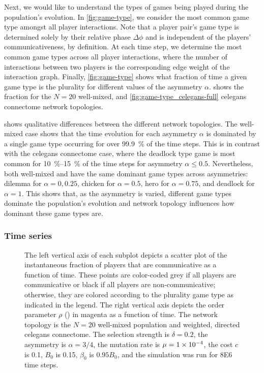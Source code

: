 \documentclass[pdflatex,lineno,referee,sn-mathphys-ay]{sn-jnl}
\begin{document}
Next, we would like to understand the types of games being played
during the population's evolution.
In \cref{fig:game-type}, we consider the most common game type
amongst all player interactions.
Note that a player pair's game type is determined solely
by their relative phase $\Delta \phi$ and is independent
of the players' communicativeness, by definition.
At each time step, we determine the most common game types
across all player interactions,
where the number of interactions between two players
is the corresponding edge weight of the interaction graph.
Finally, \cref{fig:game-type} shows what fraction of time
a given game type is the plurality for different values
of the asymmetry $\alpha$.
shows the fraction for the
$N=20$ well-mixed,
and
\cref{fig:game-type_celegans-full}
\gls{celegans} connectome network topologies.

 shows qualitative differences
between the different network topologies.
The  well-mixed case
shows that the time evolution for each asymmetry $\alpha$
is dominated by a single game type
occurring for over \SI{99.9}{\percent} of the time steps.
This is in contrast with the
 \gls{celegans} connectome case,
where the deadlock type game is most common
for \SIrange{10}{15}{\percent} of the time steps
for asymmetry $\alpha \le 0.5$.
Nevertheless, both  well-mixed
and  have the same dominant game types
across asymmetries:
dilemma for $\alpha = 0, 0.25$, chicken for $\alpha = 0.5$,
hero for $\alpha = 0.75$, and deadlock for $\alpha = 1$.
This shows that, as the asymmetry is varied,
different game types dominate the population's evolution
and network topology influences how dominant these game types are.

\subsubsection{Time series}
\begin{figure}
  \centering
  
  \caption{
    The left vertical axis of each subplot depicts a scatter plot of
    the instantaneous fraction of players that are communicative
    as a function of time.
    These points are color-coded
    grey if all players are communicative or
    black if all players are non-communicative;
    otherwise, they are colored according
    to the plurality game type as indicated in the legend.
    The right vertical axis depicts the order parameter $\rho$
    () in magenta as a function of time.
    The network topology is the
    $N=20$ well-mixed population
    and
    weighted, directed \gls{celegans} connectome.
    The selection strength is $\delta=0.2$,
    the asymmetry is $\alpha=3/4$,
    the mutation rate is $\mu=\num{1E-4}$,
    the cost $c$ is \num{0.1},
    $B_0$ is \num{0.15},
    $\beta_0$ is $\num{0.95} B_0$,
    and the simulation was run for \num{8E6} time steps.
  }
  \label{fig:time-series}
\end{figure}
\end{document}
